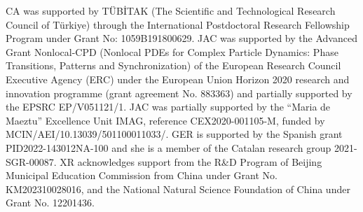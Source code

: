 \documentclass[11pt,twoside]{article}
\numberwithin{equation}{section}
\DeclareMathOperator{\sign}{sign}
\theoremstyle{plain}
\theoremstyle{nonumberplain}
\begin{document}
{\bigskip
{} 
CA was supported by TÜBİTAK (The Scientific and Technological Research Council of Türkiye) through the International Postdoctoral Research Fellowship Program under Grant No: 1059B191800629.
JAC was supported by the Advanced Grant Nonlocal-CPD (Nonlocal PDEs for Complex Particle Dynamics: Phase Transitions, Patterns and Synchronization) of the European Research Council Executive Agency (ERC) under the European Union Horizon 2020 research and innovation programme (grant agreement No. 883363) and  partially supported by the EPSRC EP/V051121/1. JAC was partially supported by the ``Maria de Maeztu'' Excellence Unit IMAG, reference CEX2020-001105-M, funded by MCIN/AEI/10.13039/501100011033/.
GER is supported by the Spanish grant PID2022-143012NA-100 and she is a member of the Catalan research group 2021-SGR-00087.
XR acknowledges support from the R\&D Program of Beijing Municipal Education Commission from China under Grant No.  KM202310028016, and the National Natural Science Foundation of China under Grant No. 12201436. 



\appendix



}
\end{document}
